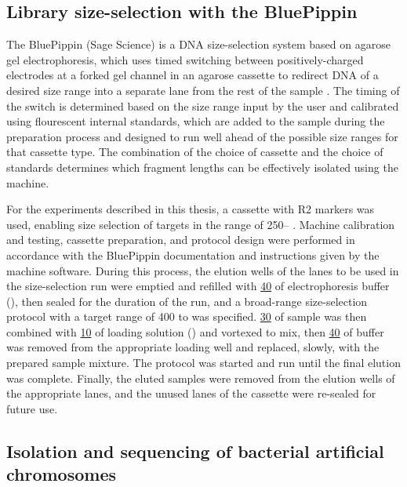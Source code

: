 \subsection{Library size-selection with the BluePippin}
\label{sec:methods_molec_standard_bluepippin}

The BluePippin (Sage Science) is a DNA size-selection system based on agarose gel electrophoresis, which uses timed switching between positively-charged electrodes at a forked gel channel in an agarose cassette to redirect DNA of a desired size range into a separate lane from the rest of the sample \parencite{sage2016bluepippin}. The timing of the switch is determined based on the size range input by the user and calibrated using flourescent internal standards, which are added to the sample during the preparation process and designed to run well ahead of the possible size ranges for that cassette type. The combination of the choice of cassette and the choice of standards determines which fragment lengths can be effectively isolated using the machine.

For the experiments described in this thesis, a  cassette with R2 markers was used, enabling size selection of targets in the range of 250-- \parencite{sage2016bluepippin}. Machine calibration and testing, cassette preparation, and protocol design were performed in accordance with the BluePippin documentation and instructions given by the machine software. During this process, the elution wells of the lanes to be used in the size-selection run were emptied and refilled with \ul{40} of electrophoresis buffer (), then sealed for the duration of the run, and a broad-range size-selection protocol with a target range of 400 to  was specified. \ul{30} of sample was then combined with \ul{10} of loading solution () and vortexed to mix, then \ul{40} of buffer was removed from the appropriate loading well and replaced, slowly, with the prepared sample mixture. The protocol was started and run until the final elution was complete. Finally, the eluted samples were removed from the elution wells of the appropriate lanes, and the unused lanes of the cassette were re-sealed for future use.

\subsection{Isolation and sequencing of bacterial artificial chromosomes}
\label{sec:methods_molec_bacs}

